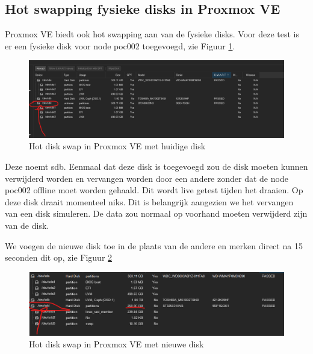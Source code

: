 \subsection{Hot swapping fysieke disks in Proxmox VE}
Proxmox VE biedt ook hot swapping aan van de fysieke disks. 
Voor deze test is er een fysieke disk voor node poc002 toegevoegd, zie Figuur \ref{fig:hotdisk-swap}.
\begin{figure}[H]
  \centering
  \hspace*{-1cm} %
  \includegraphics[width=1.1\textwidth, trim=0cm 0cm 15cm 0cm, clip]{../poc/hot-disk-prox.png}
  \caption{Hot disk swap in Proxmox VE met huidige disk}
  \label{fig:hotdisk-swap}
\end{figure}

Deze noemt sdb. Eenmaal dat deze disk is toegevoegd zou de disk moeten kunnen verwijderd worden en vervangen worden door een andere zonder dat de node poc002 offline moet worden gehaald.
Dit wordt live getest tijden het draaien. Op deze disk draait momenteel niks. Dit is belangrijk aangezien we het vervangen van een disk simuleren. De data zou normaal op voorhand moeten verwijderd zijn van de disk.

We voegen de nieuwe disk toe in de plaats van de andere en merken direct na 15 seconden dit op, zie Figuur \ref{fig:hotdiskvervangen-swap}
\begin{figure}[H]
  \centering
  \hspace*{-1cm}
  \includegraphics[width=1.1\textwidth, trim=0cm 0cm 10cm 0cm, clip]{../poc/hot-disktwee-prox.png}
  \caption{Hot disk swap in Proxmox VE met nieuwe disk}
  \label{fig:hotdiskvervangen-swap}
\end{figure}


